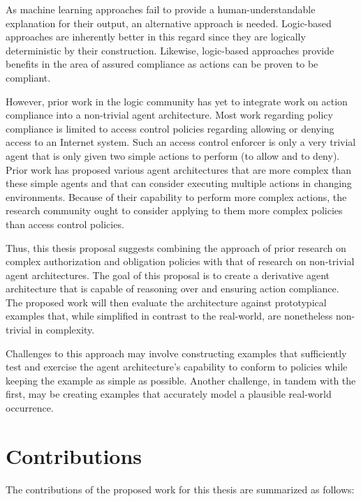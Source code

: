 As machine learning approaches fail to provide a human-understandable explanation for their output, an alternative approach is needed.
Logic-based approaches are inherently better in this regard since they are logically deterministic by their construction.
Likewise, logic-based approaches provide benefits in the area of assured compliance as actions can be proven to be compliant.

However, prior work in the logic community has yet to integrate work on action compliance into a non-trivial agent architecture.
Most work regarding policy compliance is limited to access control policies regarding allowing or denying access to an Internet system.
Such an access control enforcer is only a very trivial agent that is only given two simple actions to perform (to allow and to deny).
Prior work has proposed various agent architectures that are more complex than these simple agents and that can consider executing multiple actions in changing environments.
Because of their capability to perform more complex actions, the research community ought to consider applying to them more complex policies than access control policies.

Thus, this thesis proposal suggests combining the approach of prior research on complex authorization and obligation policies with that of research on non-trivial agent architectures.
The goal of this proposal is to create a derivative agent architecture that is capable of reasoning over and ensuring action compliance.
The proposed work will then evaluate the architecture against prototypical examples that, while simplified in contrast to the real-world, are nonetheless non-trivial in complexity.

Challenges to this approach may involve constructing examples that sufficiently test and exercise the agent architecture's capability to conform to policies while keeping the example as simple as possible.
Another challenge, in tandem with the first, may be creating examples that accurately model a plausible real-world occurrence.

\section{Contributions}

The contributions of the proposed work for this thesis are summarized as follows:

